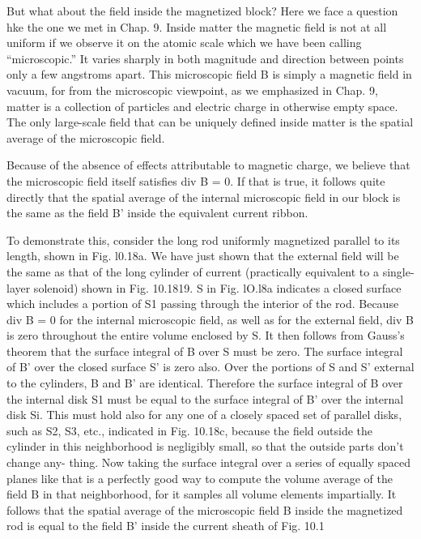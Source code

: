 But what about the field inside the magnetized block? Here we
face a question hke the one we met in Chap. 9. Inside matter the
magnetic field is not at all uniform if we observe it on the atomic
scale which we have been calling ``microscopic.'' It varies sharply
in both magnitude and direction between points only a few angstroms
apart. This microscopic field B is simply a magnetic field in vacuum,
for from the microscopic viewpoint, as we emphasized in Chap. 9,
matter is a collection of particles and electric charge in otherwise
empty space. The only large-scale field that can be uniquely defined
inside matter is the spatial average of the microscopic field.

Because of the absence of effects attributable to magnetic charge,
we believe that the microscopic field itself satisfies div B = 0. If that
is true, it follows quite directly that the spatial average of the internal
microscopic field in our block is the same as the field B' inside the
equivalent current ribbon.

To demonstrate this, consider the long rod uniformly magnetized
parallel to its length, shown in Fig. l0.18a. We have just shown that
the external field will be the same as that of the long cylinder of current
(practically equivalent to a single-layer solenoid) shown in
Fig. 10.1819. S in Fig. lO.l8a indicates a closed surface which includes
a portion of S1 passing through the interior of the rod.
Because div B = 0 for the internal microscopic field, as well as for
the external field, div B is zero throughout the entire volume enclosed
by S. It then follows from Gauss's theorem that the surface integral
of B over S must be zero. The surface integral of B' over the closed
surface S' is zero also. Over the portions of S and S' external to the
cylinders, B and B' are identical. Therefore the surface integral of B
over the internal disk S1 must be equal to the surface integral of B'
over the internal disk Si. This must hold also for any one of a closely
spaced set of parallel disks, such as S2, S3, etc., indicated in
Fig. 10.18c, because the field outside the cylinder in this neighborhood
is negligibly small, so that the outside parts don't change any-
thing. Now taking the surface integral over a series of equally spaced
planes like that is a perfectly good way to compute the volume
average of the field B in that neighborhood, for it samples all volume
elements impartially. It follows that the spatial average of the microscopic
field B inside the magnetized rod is equal to the field B' inside
the current sheath of Fig. 10.1%

